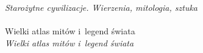 \documentclass[a4paper,11pt]{article}
\begin{document}
\Powin \emph{Starożytne cywilizacje. Wierzenia, mitologia, sztuka} \\
 \\
\Jest  Wielki atlas mitów i~legend świata \\
\Powin \emph{Wielki atlas mitów i~legend świata} \\


\vspace{\spaceTwo}










 {}



\end{document}
